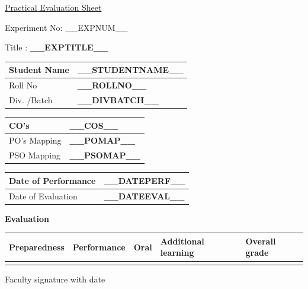 \documentclass[12pt]{article}
\newcommand{\expnum}{__EXPNUM__}
\newcommand{\exptitle}{__EXPTITLE__}
\newcommand{\studentname}{__STUDENTNAME__}
\newcommand{\rollno}{__ROLLNO__}
\newcommand{\divbatch}{__DIVBATCH__}
\newcommand{\coursecos}{__COS__}
\newcommand{\pomap}{__POMAP__}
\newcommand{\psomap}{__PSOMAP__}
\newcommand{\dateperf}{__DATEPERF__}
\newcommand{\dateeval}{__DATEEVAL__}
\begin{document}
\thispagestyle{empty}

\begin{center}
    {\large\underline{Practical Evaluation Sheet}}
\end{center}

\vspace{1.5em}

\noindent Experiment No: \expnum\par
\vspace{0.4em}
\noindent Title \hspace{2em}: \textbf{\exptitle}\par

\vspace{1em}

\noindent
\begin{tabular}{|p{}|p{}|}
\hline
Student Name & \textbf{\studentname} \\ \hline
Roll No & \textbf{\rollno} \\ \hline
Div. /Batch & \textbf{\divbatch} \\ \hline
\end{tabular}

\vspace{1.5em}

\noindent
\begin{tabular}{|p{}|p{}|}
\hline
CO's & \textbf{\coursecos} \\ \hline
PO's Mapping & \textbf{\pomap} \\ \hline
PSO Mapping & \textbf{\psomap} \\ \hline
\end{tabular}

\vspace{1.5em}

\noindent
\begin{tabular}{|p{}|p{}|}
\hline
Date of Performance & \textbf{\dateperf} \\ \hline
Date of Evaluation & \textbf{\dateeval} \\ \hline
\end{tabular}

\vspace{1.5em}

\noindent\textbf{Evaluation}

\vspace{0.5em}
\noindent
\begin{tabular}{|p{}|p{}|p{}|p{}|p{}|}
\hline
Preparedness & Performance & Oral & Additional learning & Overall grade \\ \hline
 & & & & \\ [2em]
\hline
\end{tabular}

\vfill

\hfill Faculty signature with date

\vspace{0.5cm}
\end{document}
